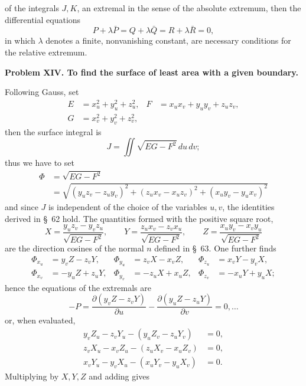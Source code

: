 \documentclass[11pt,a4paper,leqno]{article}
\begin{document}
of the integrals $J,K$, an extremal in the sense of the absolute extremum,
then the differential equations
\[
P+\lambda\bar P=Q+\lambda\bar Q=R+\lambda\bar R=0,
\]
in which $\lambda$ denotes a finite, nonvanishing constant, are necessary
conditions for the relative extremum.

\begin{center}
\textbf{Problem XIV. To find the surface of least area with a given
boundary.}
\end{center}

Following Gauss, set
\[
\begin{aligned}
E&=x_u^2+y_u^2+z_u^2,
&F&=x_ux_v+y_uy_v+z_uz_v,\\
G&=x_v^2+y_v^2+z_v^2,
\end{aligned}
\]
then the surface integral is
\[
J=\iint\sqrt{EG-F^2}\,du\,dv;
\]
thus we have to set
\[
\begin{aligned}
\Phi&=\sqrt{EG-F^2}\\
&=\sqrt{(y_uz_v-z_uy_v)^2+(z_ux_v-x_uz_v)^2+(x_uy_v-y_ux_v)^2}
\end{aligned}
\]
and since $J$ is independent of the choice of the variables $u,v$,
the identities derived in \S~62 hold. The quantities formed with the
positive square root,
\[
X=\frac{y_uz_v-y_vz_u}{\sqrt{EG-F^2}},\qquad
Y=\frac{z_ux_v-z_vx_u}{\sqrt{EG-F^2}},\qquad
Z=\frac{x_uy_v-x_vy_u}{\sqrt{EG-F^2}}
\]
are the direction cosines of the normal $n$ defined in \S~63.
One further finds
\begin{equation}\tag{10}
\begin{aligned}
\Phi_{x_u}&=y_vZ-z_vY,&
\Phi_{y_u}&=z_vX-x_vZ,&
\Phi_{z_u}&=x_vY-y_vX,\\
\Phi_{x_v}&=-y_uZ+z_uY,&
\Phi_{y_v}&=-z_uX+x_uZ,&
\Phi_{z_v}&=-x_uY+y_uX;
\end{aligned}
\end{equation}
hence the equations of the extremals are
\[
-P=\frac{\partial(y_vZ-z_vY)}{\partial u}
-\frac{\partial(y_uZ-z_uY)}{\partial v}=0,\ldots
\]
or, when evaluated,
\[
\begin{aligned}
y_vZ_u-z_vY_u-(y_uZ_v-z_uY_v)&=0,\\
z_vX_u-x_vZ_u-(z_uX_v-x_uZ_v)&=0,\\
x_vY_u-y_vX_u-(x_uY_v-y_uX_v)&=0.
\end{aligned}
\]
Multiplying by $X,Y,Z$ and adding gives
\end{document}
